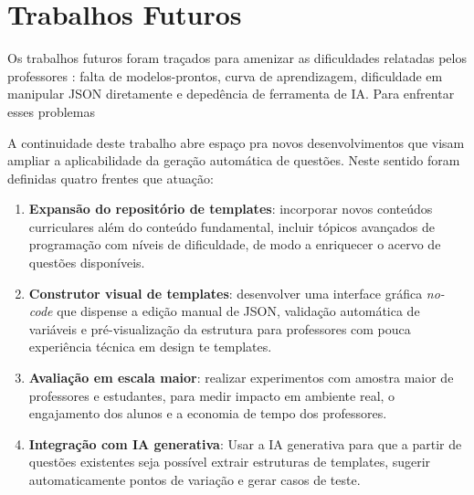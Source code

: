 \section{Trabalhos Futuros}


Os trabalhos futuros foram traçados para amenizar as dificuldades relatadas pelos professores : falta de modelos-prontos, curva de aprendizagem, dificuldade em manipular JSON diretamente e depedência de ferramenta de IA. Para enfrentar esses problemas 



A continuidade deste trabalho abre espaço pra novos desenvolvimentos que visam ampliar a aplicabilidade da geração automática de questões. Neste sentido foram definidas quatro frentes que atuação:

\begin{enumerate}[label=\alph*)]
  \item \textbf{Expansão do repositório de templates}: incorporar novos conteúdos curriculares além do conteúdo fundamental, incluir tópicos avançados de programação com níveis de dificuldade, de modo a enriquecer o acervo de questões disponíveis.
  \item \textbf{Construtor visual de templates}: desenvolver uma interface gráfica \emph{no-code} que dispense a edição manual de JSON, validação automática de variáveis e pré-visualização da estrutura para professores com pouca experiência técnica em design te templates.
  \item \textbf{Avaliação em escala maior}: realizar experimentos com amostra maior de professores e estudantes, para medir impacto em ambiente real, o engajamento dos alunos e a economia de tempo dos professores.
  \item \textbf{Integração com IA generativa}: Usar a IA generativa para que a partir de questões existentes seja possível extrair estruturas de templates, sugerir automaticamente pontos de variação e gerar casos de teste.
\end{enumerate}


